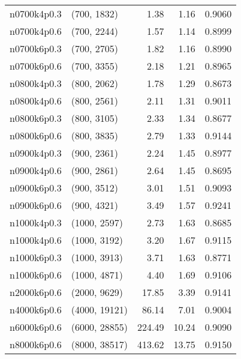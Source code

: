 \begin{tabular}{llrrr}
n0700k4p0.3 &   (700, 1832) &      1.38 &     1.16 & 0.9060 \\
n0700k4p0.6 &   (700, 2244) &      1.57 &     1.14 & 0.8999 \\
n0700k6p0.3 &   (700, 2705) &      1.82 &     1.16 & 0.8990 \\
n0700k6p0.6 &   (700, 3355) &      2.18 &     1.21 & 0.8965 \\
n0800k4p0.3 &   (800, 2062) &      1.78 &     1.29 & 0.8673 \\
n0800k4p0.6 &   (800, 2561) &      2.11 &     1.31 & 0.9011 \\
n0800k6p0.3 &   (800, 3105) &      2.33 &     1.34 & 0.8677 \\
n0800k6p0.6 &   (800, 3835) &      2.79 &     1.33 & 0.9144 \\
n0900k4p0.3 &   (900, 2361) &      2.24 &     1.45 & 0.8977 \\
n0900k4p0.6 &   (900, 2861) &      2.64 &     1.45 & 0.8695 \\
n0900k6p0.3 &   (900, 3512) &      3.01 &     1.51 & 0.9093 \\
n0900k6p0.6 &   (900, 4321) &      3.49 &     1.57 & 0.9241 \\
n1000k4p0.3 &  (1000, 2597) &      2.73 &     1.63 & 0.8685 \\
n1000k4p0.6 &  (1000, 3192) &      3.20 &     1.67 & 0.9115 \\
n1000k6p0.3 &  (1000, 3913) &      3.71 &     1.63 & 0.8771 \\
n1000k6p0.6 &  (1000, 4871) &      4.40 &     1.69 & 0.9106 \\
n2000k6p0.6 &  (2000, 9629) &     17.85 &     3.39 & 0.9141 \\
n4000k6p0.6 & (4000, 19121) &     86.14 &     7.01 & 0.9004 \\
n6000k6p0.6 & (6000, 28855) &    224.49 &    10.24 & 0.9090 \\
n8000k6p0.6 & (8000, 38517) &    413.62 &    13.75 & 0.9150 \\
\bottomrule
\end{tabular}
